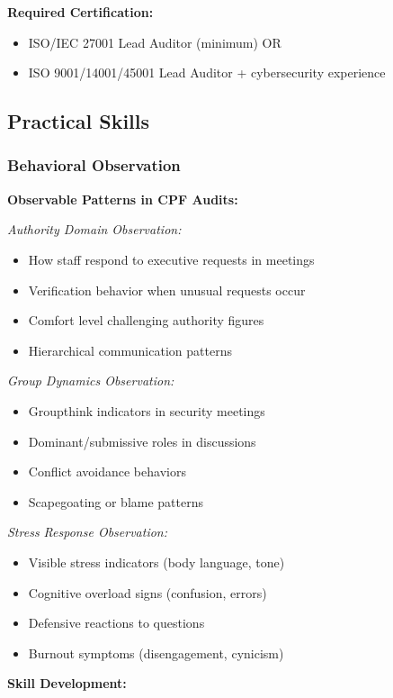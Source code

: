 \documentclass[11pt,a4paper]{article}
\begin{document}
\textbf{Required Certification:}
\begin{itemize}
\item ISO/IEC 27001 Lead Auditor (minimum) OR
\item ISO 9001/14001/45001 Lead Auditor + cybersecurity experience
\end{itemize}

\subsection{Practical Skills}

\subsubsection{Behavioral Observation}

\textbf{Observable Patterns in CPF Audits:}

\textit{Authority Domain Observation:}
\begin{itemize}
\item How staff respond to executive requests in meetings
\item Verification behavior when unusual requests occur
\item Comfort level challenging authority figures
\item Hierarchical communication patterns
\end{itemize}

\textit{Group Dynamics Observation:}
\begin{itemize}
\item Groupthink indicators in security meetings
\item Dominant/submissive roles in discussions
\item Conflict avoidance behaviors
\item Scapegoating or blame patterns
\end{itemize}

\textit{Stress Response Observation:}
\begin{itemize}
\item Visible stress indicators (body language, tone)
\item Cognitive overload signs (confusion, errors)
\item Defensive reactions to questions
\item Burnout symptoms (disengagement, cynicism)
\end{itemize}

\textbf{Skill Development:}
\end{document}
